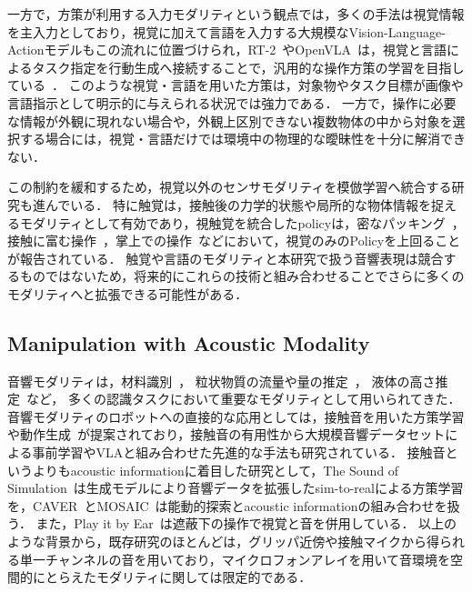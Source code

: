 \documentclass{article}
\begin{document}
一方で，方策が利用する入力モダリティという観点では，多くの手法は視覚情報を主入力としており，視覚に加えて言語を入力する大規模なVision-Language-Actionモデルもこの流れに位置づけられ，RT-2~\citep{brohan2023rt2}やOpenVLA~\citep{kim2024openvla}は，視覚と言語によるタスク指定を行動生成へ接続することで，汎用的な操作方策の学習を目指している~\citep{vla_survey2025}．
このような視覚・言語を用いた方策は，対象物やタスク目標が画像や言語指示として明示的に与えられる状況では強力である．
一方で，操作に必要な情報が外観に現れない場合や，外観上区別できない複数物体の中から対象を選択する場合には，視覚・言語だけでは環境中の物理的な曖昧性を十分に解消できない．

この制約を緩和するため，視覚以外のセンサモダリティを模倣学習へ統合する研究も進んでいる．
特に触覚は，接触後の力学的状態や局所的な物体情報を捉えるモダリティとして有効であり，視触覚を統合したpolicyは，密なパッキング~\citep{seehearfeel}，接触に富む操作~\citep{vtt2022,sts_il2024,vitamin2024,tacthru2025}，掌上での操作~\citep{neuralfeels2024}などにおいて，視覚のみのPolicyを上回ることが報告されている．
触覚や言語のモダリティと本研究で扱う音響表現は競合するものではないため，将来的にこれらの技術と組み合わせることでさらに多くのモダリティへと拡張できる可能性がある．
\subsection{Manipulation with Acoustic Modality}
音響モダリティは，材料識別~\citep{eppe2018interactive,jin2019openenv}，
粒状物質の流量や量の推定~\citep{clarke2018learning,wilson2019pouring}，
液体の高さ推定~\citep{liang2020audiopouring,du2021robotpouring}など，
多くの認識タスクにおいて重要なモダリティとして用いられてきた．
音響モダリティのロボットへの直接的な応用としては，接触音を用いた方策学習\citep{seehearfeel,maniwav}や動作生成~\citep{thatsoundsright}が提案されており，接触音の有用性から大規模音響データセットによる事前学習\citep{hearingtouch2024}やVLAと組み合わせた先進的な手法\citep{audiovla}も研究されている．
接触音というよりもacoustic informationに着目した研究として，The Sound of Simulation~\citep{multigen2025}は生成モデルにより音響データを拡張したsim-to-realによる方策学習を，CAVER~\citep{caver2025}とMOSAIC~\citep{mosaic2024}は能動的探索とacoustic informationの組み合わせを扱う．
また，Play it by Ear~\citep{playitbyear}は遮蔽下の操作で視覚と音を併用している．
以上のような背景から，既存研究のほとんどは，グリッパ近傍や接触マイクから得られる単一チャンネルの音を用いており，マイクロフォンアレイを用いて音環境を空間的にとらえたモダリティに関しては限定的である．
\end{document}
